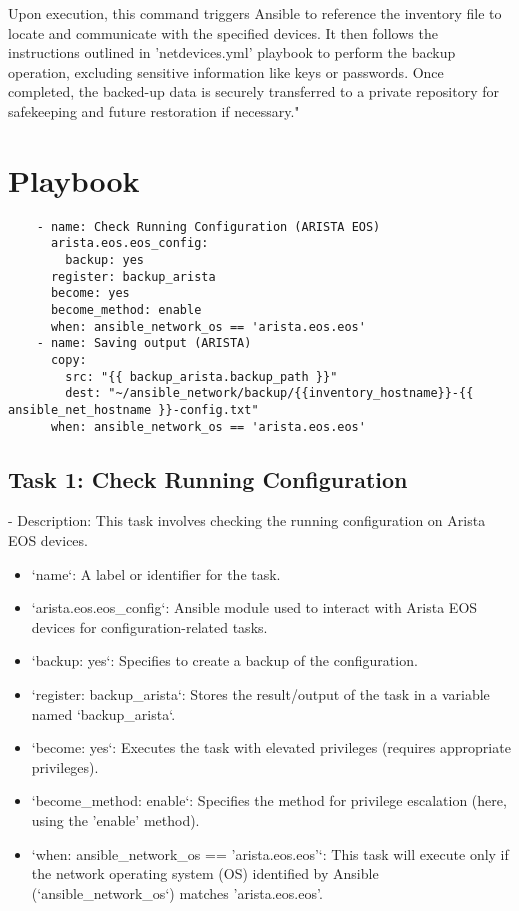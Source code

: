 Upon execution, this command triggers Ansible to reference the inventory file to locate and communicate with the specified devices. It then follows the instructions outlined in 'netdevices.yml' playbook to perform the backup operation, excluding sensitive information like keys or passwords. Once completed, the backed-up data is securely transferred to a private repository for safekeeping and future restoration if necessary."

\newpage
\section{Playbook}
\begin{verbatim}
    - name: Check Running Configuration (ARISTA EOS)
      arista.eos.eos_config:
        backup: yes
      register: backup_arista
      become: yes
      become_method: enable
      when: ansible_network_os == 'arista.eos.eos'
    - name: Saving output (ARISTA)
      copy:
        src: "{{ backup_arista.backup_path }}"
        dest: "~/ansible_network/backup/{{inventory_hostname}}-{{ ansible_net_hostname }}-config.txt"
      when: ansible_network_os == 'arista.eos.eos'
\end{verbatim}

\subsection{Task 1: Check Running Configuration 
}
- Description: This task involves checking the running configuration on Arista EOS devices.
\begin{itemize}
    \item  `name`: A label or identifier for the task.
    \item  `arista.eos.eos_config`: Ansible module used to interact with Arista EOS devices for configuration-related tasks.
    \item  `backup: yes`: Specifies to create a backup of the configuration.
    \item  `register: backup_arista`: Stores the result/output of the task in a variable named `backup_arista`.
    \item  `become: yes`: Executes the task with elevated privileges (requires appropriate privileges).
    \item  `become_method: enable`: Specifies the method for privilege escalation (here, using the 'enable' method).
    \item  `when: ansible_network_os == 'arista.eos.eos'`: This task will execute only if the network operating system (OS) identified by Ansible (`ansible_network_os`) matches 'arista.eos.eos'.
\end{itemize}

